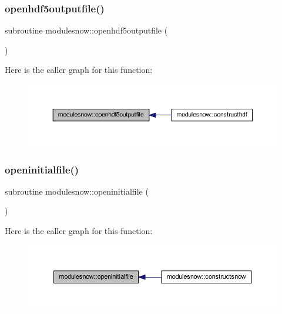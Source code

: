 \subsubsection{\texorpdfstring{openhdf5outputfile()}{openhdf5outputfile()}}
{\footnotesize\ttfamily subroutine modulesnow\+::openhdf5outputfile (\begin{DoxyParamCaption}{ }\end{DoxyParamCaption})\hspace{0.3cm}{\ttfamily [private]}}

Here is the caller graph for this function\+:\nopagebreak
\begin{figure}[H]
\begin{center}
\leavevmode
\includegraphics[width=350pt]{namespacemodulesnow_a65a805e3fa668273a96e5a6c2f76644d_icgraph}
\end{center}
\end{figure}
\mbox{\label{namespacemodulesnow_a78835d47393c5328c084dddbc4457d6d}} 
\subsubsection{\texorpdfstring{openinitialfile()}{openinitialfile()}}
{\footnotesize\ttfamily subroutine modulesnow\+::openinitialfile (\begin{DoxyParamCaption}{ }\end{DoxyParamCaption})\hspace{0.3cm}{\ttfamily [private]}}

Here is the caller graph for this function\+:\nopagebreak
\begin{figure}[H]
\begin{center}
\leavevmode
\includegraphics[width=350pt]{namespacemodulesnow_a78835d47393c5328c084dddbc4457d6d_icgraph}
\end{center}
\end{figure}
\mbox{\label{namespacemodulesnow_a6ca0e43e3af7be1542e8e61ec1d6d7b6}} 

